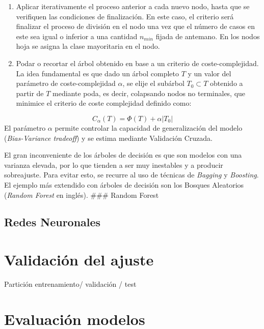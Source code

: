 \documentclass[12pt,a4paper,]{book}
\numberwithin{dummy}{section}
\theoremstyle{ocrenumbox}
\theoremstyle{blacknumex}
\theoremstyle{blacknumbox}
\theoremstyle{ocrenum}
\theoremstyle{ocrenum}
\begin{document}
\begin{enumerate}
\def\labelenumi{\arabic{enumi}.}
\setcounter{enumi}{2}
\item
  Aplicar iterativamente el proceso anterior a cada nuevo nodo, hasta
  que se verifiquen las condiciones de finalización. En este caso, el
  criterio será finalizar el proceso de división en el nodo una vez que
  el número de casos en este sea igual o inferior a una cantidad
  \(n_{min}\) fijada de antemano. En los nodos hoja se asigna la clase
  mayoritaria en el nodo.
\item
  Podar o recortar el árbol obtenido en base a un criterio de
  coste-complejidad. La idea fundamental es que dado un árbol completo
  \(T\) y un valor del parámetro de coste-complejidad \(\alpha\), se
  elije el subárbol \(T_0 \subset T\) obtenido a partir de \(T\)
  mediante poda, es decir, colapsando nodos no terminales, que minimice
  el criterio de coste complejidad definido como:
\end{enumerate}

\[C_{\alpha}(T) = \Phi(T) + \alpha|T_0|\] El parámetro \(\alpha\)
permite controlar la capacidad de generalización del modelo
(\emph{Bias-Variance tradeoff}) y se estima mediante Validación Cruzada.

El gran inconveniente de los árboles de decisión es que son modelos con
una varianza elevada, por lo que tienden a ser muy inestables y a
producir sobreajuste. Para evitar esto, se recurre al uso de técnicas de
\emph{Bagging} y \emph{Boosting}. El ejemplo más extendido con árboles
de decisión son los Bosques Aleatorios (\emph{Random Forest} en inglés).
\#\#\# Random Forest

\hypertarget{redes-neuronales}{%
\subsection{Redes Neuronales}\label{redes-neuronales}}

\hypertarget{validaciuxf3n-del-ajuste}{%
\section{Validación del ajuste}\label{validaciuxf3n-del-ajuste}}

Partición entrenamiento/ validación / test

\hypertarget{evaluaciuxf3n-modelos}{%
\section{Evaluación modelos}\label{evaluaciuxf3n-modelos}}
\end{document}
